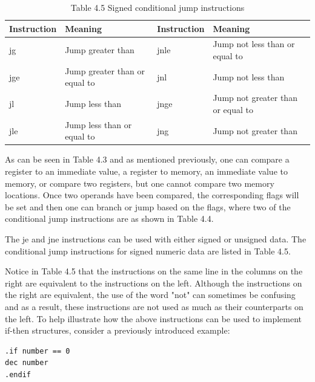 \documentclass[10pt]{book}
\begin{document}
\begin{table}[htbp]
\begin{center}
\captionsetup{labelformat=empty}
\caption{Table 4.5 Signed conditional jump instructions}
\begin{tabular}{|l|l|l|l|}
\hline
Instruction & Meaning & Instruction & Meaning \\
\hline
jg & Jump greater than & jnle & Jump not less than or equal to \\
\hline
jge & Jump greater than or equal to & jnl & Jump not less than \\
\hline
jl & Jump less than & jnge & Jump not greater than or equal to \\\index{jc}\index{jnc}\index{jno}\index{jnp}\index{jns}
\hline
jle & Jump less than or equal to & jng & Jump not greater than \\
\hline
\end{tabular}
\end{center}
\end{table}

As can be seen in Table 4.3 and as mentioned previously, one can compare a register to an immediate value, a register to memory, an immediate value to memory, or compare two registers, but one cannot compare two memory locations. Once two operands have been compared, the corresponding flags will be set and then one can branch or jump based on the flags, where two of the conditional jump instructions are as shown in Table 4.4.


The je and jne instructions can be used with either signed or unsigned data. The conditional jump instructions for signed numeric data are listed in Table 4.5.

Notice in Table 4.5 that the instructions on the same line in the columns on the right are equivalent to the instructions on the left. Although the instructions on the right are equivalent, the use of the word "not" can sometimes be confusing and as a result, these instructions are not used as much as their counterparts on the left. To help illustrate how the above instructions can be used to implement if-then structures, consider a previously introduced example:

\begin{verbatim}
.if number == 0
dec number
.endif
\end{verbatim}
\end{document}
